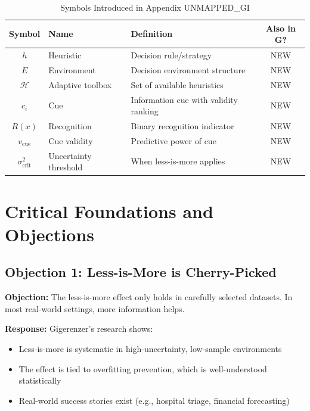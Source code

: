 \vspace{0.5em}

\begin{table}[htbp]
\centering
\caption{Symbols Introduced in Appendix UNMAPPED_GI}
\label{tab:gi-symbols}
\renewcommand{\arraystretch}{1.3}
\begin{tabular}{@{}clp{6cm}c@{}}
\toprule
\textbf{Symbol} & \textbf{Name} & \textbf{Definition} & \textbf{Also in G?} \\
\midrule
$h$ & Heuristic & Decision rule/strategy & NEW \\
$E$ & Environment & Decision environment structure & NEW \\
$\mathcal{H}$ & Adaptive toolbox & Set of available heuristics & NEW \\
$c_i$ & Cue & Information cue with validity ranking & NEW \\
$R(x)$ & Recognition & Binary recognition indicator & NEW \\
$v_{\text{cue}}$ & Cue validity & Predictive power of cue & NEW \\
$\sigma^2_{\text{crit}}$ & Uncertainty threshold & When less-is-more applies & NEW \\
\bottomrule
\end{tabular}
\end{table}


\section{Critical Foundations and Objections}
\label{sec:gi-foundations}

\subsection{Objection 1: Less-is-More is Cherry-Picked}

\textbf{Objection:} The less-is-more effect only holds in carefully selected datasets. In most real-world settings, more information helps.

\textbf{Response:} Gigerenzer's research shows:
\begin{itemize}[nosep]
\item Less-is-more is systematic in high-uncertainty, low-sample environments
\item The effect is tied to overfitting prevention, which is well-understood statistically
\item Real-world success stories exist (e.g., hospital triage, financial forecasting)
\end{itemize}

